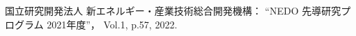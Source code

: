 ﻿\begin{thebibliography}{99}

     国立研究開発法人 新エネルギー・産業技術総合開発機構：
     ``NEDO 先導研究プログラム 2021年度''，
     Vol.1,
     p.57, 
     2022. 
\end{thebibliography}
\endinput